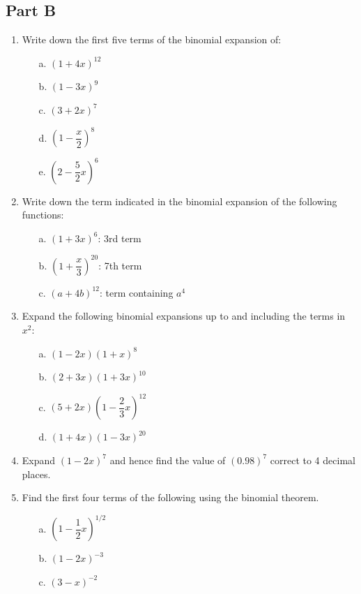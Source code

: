 \subsection*{Part B}

\begin{enumerate}
\item Write down the first five terms of the binomial expansion of:
\begin{enumerate}
  \item[a.] $(1+4x)^{12}$
  \item[b.] $(1-3x)^9$
  \item[c.] $(3+2x)^7$
  \item[d.] $\left(1-\dfrac{x}{2}\right)^8$
  \item[e.] $\left(2-\dfrac{5}{2}x\right)^6$
\end{enumerate}

\item Write down the term indicated in the binomial expansion of the following
functions:
\begin{enumerate}
  \item[a.] $(1+3x)^6$: 3rd term
  \item[b.] $\left(1+\dfrac{x}{3}\right)^{20}$: 7th term
  \item[c.] $(a+4b)^{12}$: term containing $a^4$
\end{enumerate}

\item Expand the following binomial expansions up to and including the terms
in $x^2$:
\begin{enumerate}
  \item[a.] $(1-2x)(1+x)^8$
  \item[b.] $(2+3x)(1+3x)^{10}$
  \item[c.] $(5+2x)\left(1-\dfrac{2}{3}x\right)^{12}$
  \item[d.] $(1+4x)(1-3x)^{20}$
\end{enumerate}

\item Expand $(1-2x)^7$ and hence find the value of $(0.98)^7$ correct to 4 decimal
places.

\item Find the first four terms of the following using the binomial theorem.
\begin{enumerate}
  \item[a.] $\left(1-\dfrac{1}{2}x\right)^{1/2}$
  \item[b.] $(1-2x)^{-3}$
  \item[c.] $(3-x)^{-2}$
\end{enumerate}


\end{enumerate}
